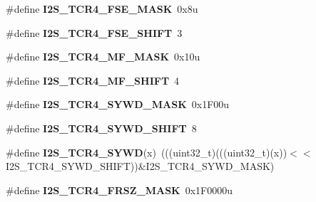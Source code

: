 \begin{DoxyCompactItemize}
\item 
\#define {\bfseries I2\+S\+\_\+\+T\+C\+R4\+\_\+\+F\+S\+E\+\_\+\+M\+A\+SK}~0x8u\hypertarget{group__I2S__Register__Masks_ga1431c095df0a4ca821052d83ca72ca96}{}\label{group__I2S__Register__Masks_ga1431c095df0a4ca821052d83ca72ca96}

\item 
\#define {\bfseries I2\+S\+\_\+\+T\+C\+R4\+\_\+\+F\+S\+E\+\_\+\+S\+H\+I\+FT}~3\hypertarget{group__I2S__Register__Masks_ga967f80d877a02e10cfe3041c0547c67f}{}\label{group__I2S__Register__Masks_ga967f80d877a02e10cfe3041c0547c67f}

\item 
\#define {\bfseries I2\+S\+\_\+\+T\+C\+R4\+\_\+\+M\+F\+\_\+\+M\+A\+SK}~0x10u\hypertarget{group__I2S__Register__Masks_ga3331c691867adbb231a8d1d7ccb4ce94}{}\label{group__I2S__Register__Masks_ga3331c691867adbb231a8d1d7ccb4ce94}

\item 
\#define {\bfseries I2\+S\+\_\+\+T\+C\+R4\+\_\+\+M\+F\+\_\+\+S\+H\+I\+FT}~4\hypertarget{group__I2S__Register__Masks_ga63d02d7aac86c3c6389035e2e3a8a96b}{}\label{group__I2S__Register__Masks_ga63d02d7aac86c3c6389035e2e3a8a96b}

\item 
\#define {\bfseries I2\+S\+\_\+\+T\+C\+R4\+\_\+\+S\+Y\+W\+D\+\_\+\+M\+A\+SK}~0x1\+F00u\hypertarget{group__I2S__Register__Masks_ga239e1c4ba761520bf2d7e0cf65c39d54}{}\label{group__I2S__Register__Masks_ga239e1c4ba761520bf2d7e0cf65c39d54}

\item 
\#define {\bfseries I2\+S\+\_\+\+T\+C\+R4\+\_\+\+S\+Y\+W\+D\+\_\+\+S\+H\+I\+FT}~8\hypertarget{group__I2S__Register__Masks_gadd23753698d7fb9a8948b1db0443fa4f}{}\label{group__I2S__Register__Masks_gadd23753698d7fb9a8948b1db0443fa4f}

\item 
\#define {\bfseries I2\+S\+\_\+\+T\+C\+R4\+\_\+\+S\+Y\+WD}(x)~(((uint32\+\_\+t)(((uint32\+\_\+t)(x))$<$$<$I2\+S\+\_\+\+T\+C\+R4\+\_\+\+S\+Y\+W\+D\+\_\+\+S\+H\+I\+FT))\&I2\+S\+\_\+\+T\+C\+R4\+\_\+\+S\+Y\+W\+D\+\_\+\+M\+A\+SK)\hypertarget{group__I2S__Register__Masks_ga3d6d1dade93eeda4a8a6914f60cbb9fc}{}\label{group__I2S__Register__Masks_ga3d6d1dade93eeda4a8a6914f60cbb9fc}

\item 
\#define {\bfseries I2\+S\+\_\+\+T\+C\+R4\+\_\+\+F\+R\+S\+Z\+\_\+\+M\+A\+SK}~0x1\+F0000u\hypertarget{group__I2S__Register__Masks_ga1348cbea02cf3f38b5112c2ed27fafa0}{}\label{group__I2S__Register__Masks_ga1348cbea02cf3f38b5112c2ed27fafa0}


\end{DoxyCompactItemize}
